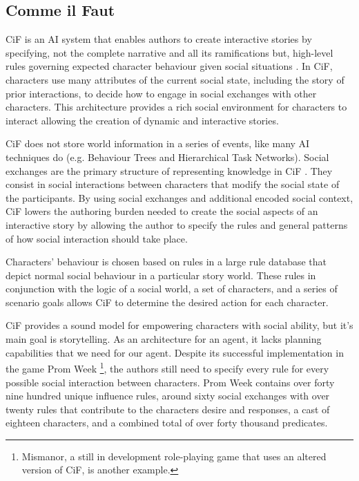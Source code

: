\subsection{Comme il Faut}
\ac{CiF} is an \ac{AI} system that enables authors to create interactive stories by specifying, not the complete narrative and all its ramifications but, high-level rules governing expected character behaviour given social situations \cite{mccoy:cif-social-story-worlds}.
In \ac{CiF}, characters use many attributes of the current social state, including the story of prior interactions, to decide how to engage in social exchanges with other characters.
This architecture provides a rich social environment for characters to interact allowing the creation of dynamic and interactive stories.

\ac{CiF} does not store world information in a series of events, like many \ac{AI} techniques do (e.g. Behaviour Trees and Hierarchical Task Networks).
Social exchanges are the primary structure of representing knowledge in \ac{CiF} \cite{mccoy:cif-authoring}.
They consist in social interactions between characters that modify the social state of the participants.
By using social exchanges and additional encoded social context, \ac{CiF} lowers the authoring burden needed to create the social aspects of an interactive story by allowing the author to specify the rules and general patterns of how social interaction should take place.

Characters' behaviour is chosen based on rules in a large rule database that depict normal social behaviour in a particular story world.
These rules in conjunction with the logic of a social world, a set of characters, and a series of scenario goals allows \ac{CiF} to determine the desired action for each character.

\ac{CiF} provides a sound model for empowering characters with social ability, but it's main goal is storytelling.
As an architecture for an agent, it lacks planning capabilities that we need for our agent.
Despite its successful implementation in the game Prom Week \cite{mccoy:prom-week} \footnote{Mismanor, a still in development role-playing game that uses an altered version of \ac{CiF}, is another example.}, the authors still need to specify every rule for every possible social interaction between characters. Prom Week contains over forty nine hundred unique influence rules, around sixty social exchanges with over twenty rules that contribute to the characters desire and responses, a cast of eighteen characters, and a combined total of over forty thousand predicates.